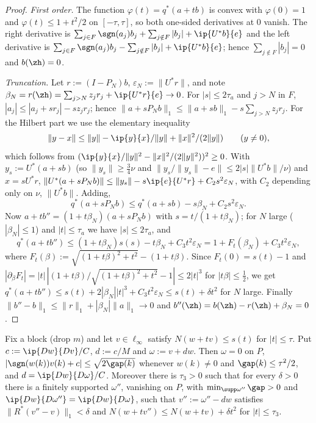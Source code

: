 \begin{proof}
\emph{First order.}  The function $\varphi(t)=q^*(a+tb)$ is convex with
$\varphi(0)=1$ and $\varphi(t)\le1+t^2/2$ on $[-\tau,\tau]$, so both one-sided
derivatives at $0$ vanish.  The right derivative is
$\sum_{j\in F}\sgn(a_j)b_j+\sum_{j\notin F}|b_j|+\ip{U^*b}{e}$ and the left
derivative is $\sum_{j\in F}\sgn(a_j)b_j-\sum_{j\notin
F}|b_j|+\ip{U^*b}{e}$; hence $\sum_{j\notin F}|b_j|=0$ and $b(\zh)=0$.

\emph{Truncation.}  Let $r:=(I-P_N)b$, $\varepsilon_N:=\|U^*r\|$, and note
$\beta_N=r(\zh)=\sum_{j>N}z_jr_j+\ip{U^*r}{e}\to0$.  For $|s|\le2\tau_a$ and
$j>N$ in $F$, $|a_j|\le|a_j+sr_j|-sz_jr_j$; hence
$\|a+sP_Nb\|_1\le\|a+sb\|_1-s\sum_{j>N}z_jr_j$.  For the Hilbert part we use
the elementary inequality
\begin{equation}\label{eq:hilbertineq}
 \|y-x\|\le\|y\|-\ip{y}{x}/\|y\|+\|x\|^2/(2\|y\|)\qquad(y\ne0),
\end{equation}
which follows from $(\ip{y}{x}/\|y\|^2-\|x\|^2/(2\|y\|^2))^2\ge0$.  With
$y_s:=U^*(a+sb)$ (so $\|y_s\|\ge\frac34\nu$ and
$\|y_s/\|y_s\|-e\|\le2|s|\|U^*b\|/\nu$) and $x=sU^*r$,
$\|U^*(a+sP_Nb)\|\le\|y_s\|-s\ip{e}{U^*r}+C_2s^2\varepsilon_N$, with $C_2$
depending only on $\nu$, $\|U^*b\|$.  Adding,
\[
 q^*(a+sP_Nb)\le q^*(a+sb)-s\beta_N+C_2s^2\varepsilon_N.
\]
Now $a+tb''=(1+t\beta_N)(a+sP_Nb)$ with $s=t/(1+t\beta_N)$; for $N$ large
($|\beta_N|\le1$) and $|t|\le\tau_a$ we have $|s|\le2\tau_a$, and
\[
 q^*(a+tb'')\le(1+t\beta_N)s(s)-t\beta_N+C_3t^2\varepsilon_N
 =1+F_t(\beta_N)+C_3t^2\varepsilon_N,
\]
where $F_t(\beta):=\sqrt{(1+t\beta)^2+t^2}-(1+t\beta)$.  Since $F_t(0)=
s(t)-1$ and $|\partial_\beta F_t|=|t|\,|(1+t\beta)/\sqrt{(1+t\beta)^2+t^2}-1|
\le2|t|^3$ for $|t\beta|\le\frac12$, we get $q^*(a+tb'')\le s(t)+
2|\beta_N||t|^3+C_3t^2\varepsilon_N\le s(t)+\delta t^2$ for $N$ large.
Finally $\|b''-b\|_1\le\|r\|_1+|\beta_N|\|a\|_1\to0$ and
$b''(\zh)=b(\zh)-r(\zh)+\beta_N=0$.
\end{proof}

\begin{lemma}\label{lem:blocktrunc}
Fix a block \textup{(}drop $m$\textup{)} and let $v\in\ell_\infty$ satisfy
$N(w+tv)\le s(t)$ for $|t|\le\tau$.  Put $c:=\ip{Dw}{Dv}/C$, $d:=c/M$ and
$\omega:=v+dw$.  Then $\omega=0$ on $P$, $|\sgn(w(k))v(k)+c|\le
\sqrt{2\gap(k)}$ whenever $w(k)\neq0$ and $\gap(k)\le\tau^2/2$, and
$d=\ip{Dw}{D\omega}/C$.  Moreover there is $\tau_3>0$ such that for every
$\delta>0$ there is a finitely supported $\omega''$, vanishing on $P$, with
$\min_{\supp\omega''}\gap>0$ and $\ip{Dw}{D\omega''}=\ip{Dw}{D\omega}$, such
that $v'':=\omega''-dw$ satisfies $\|R^*(v''-v)\|_1<\delta$ and
$N(w+tv'')\le N(w+tv)+\delta t^2$ for $|t|\le\tau_3$.
\end{lemma}

